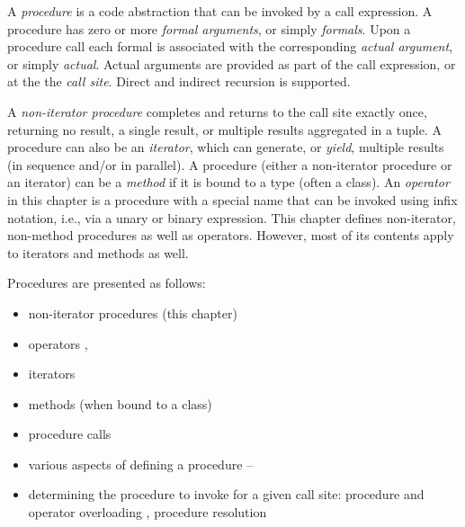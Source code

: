 \label{Procedures}

A \emph{procedure} is a code abstraction that can be invoked by a call
expression.
A procedure has zero or more \emph{formal arguments}, or simply
\emph{formals}. Upon a procedure call each formal is associated
with the corresponding \emph{actual argument}, or simply
\emph{actual}. Actual arguments are provided as part of the call
expression, or at the the \emph{call site}.
Direct and indirect recursion is supported.

A \emph{non-iterator procedure} completes and returns to
the call site exactly once, returning no result, a single result, or
multiple results aggregated in a tuple. A procedure can also be an
\emph{iterator}, which can generate, or \emph{yield}, multiple results (in
sequence and/or in parallel). A procedure (either a non-iterator procedure or an
iterator) can be a \emph{method} if it is bound to a type (often a
class). An \emph{operator} in this chapter is a procedure
with a special name that can be invoked using infix notation,
i.e., via a unary or binary expression.
This chapter defines non-iterator, non-method procedures as well as operators. However, most of its contents
apply to iterators and methods as well.

Procedures are presented as follows:
\begin{itemize}
\item non-iterator procedures (this chapter)
\item operators , 
\item iterators 
\item methods (when bound to a class) 
\item procedure calls 
\item various aspects of defining a procedure
      --
\item determining the procedure to invoke for a given call site:
      procedure and operator overloading ,
      procedure resolution 
\end{itemize}


